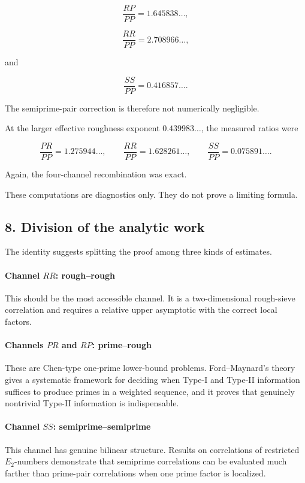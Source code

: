 \[
\frac{RP}{PP}=1.645838\ldots,
\]

\[
\frac{RR}{PP}=2.708966\ldots,
\]

and

\[
\frac{SS}{PP}=0.416857\ldots.
\]

The semiprime-pair correction is therefore not numerically negligible.

At the larger effective roughness exponent \(0.439983\ldots\), the measured ratios were

\[
\frac{PR}{PP}=1.275944\ldots,
\qquad
\frac{RR}{PP}=1.628261\ldots,
\qquad
\frac{SS}{PP}=0.075891\ldots.
\]

Again, the four-channel recombination was exact.

These computations are diagnostics only. They do not prove a limiting formula.

\subsection*{8. Division of the analytic work}

The identity suggests splitting the proof among three kinds of estimates.

\paragraph{Channel \(RR\): rough--rough}

This should be the most accessible channel. It is a two-dimensional rough-sieve correlation and requires a relative upper asymptotic with the correct local factors.

\paragraph{Channels \(PR\) and \(RP\): prime--rough}

These are Chen-type one-prime lower-bound problems. Ford--Maynard's theory gives a systematic framework for deciding when Type-I and Type-II information suffices to produce primes in a weighted sequence, and it proves that genuinely nontrivial Type-II information is indispensable.

\paragraph{Channel \(SS\): semiprime--semiprime}

This channel has genuine bilinear structure. Results on correlations of restricted \(E_2\)-numbers demonstrate that semiprime correlations can be evaluated much farther than prime-pair correlations when one prime factor is localized.

